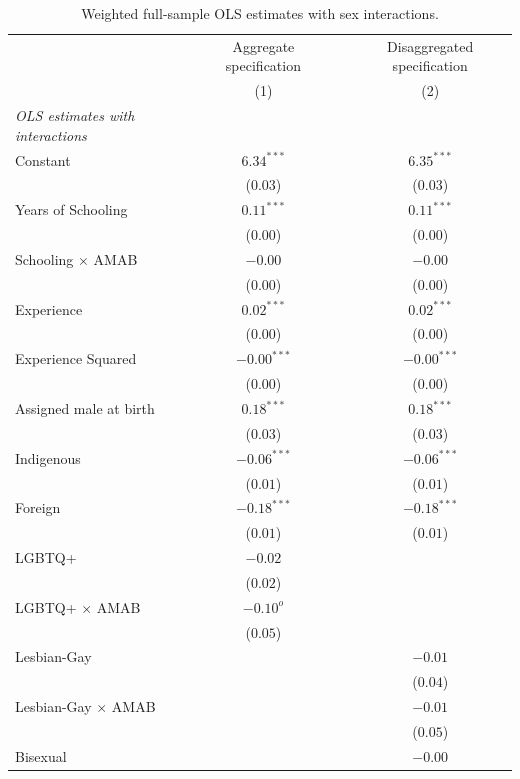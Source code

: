 \begin{table}[H]
\begin{center}
\begin{threeparttable}
\captionsetup{margin=0.5cm}
\caption{Weighted full-sample OLS estimates with sex interactions.}
\label{tab:MCO_CASEN_2cols}
\footnotesize
\centering
\begin{tabular}{lccc}
\toprule
 & \multicolumn{1}{c}{Aggregate specification} & & \multicolumn{1}{c}{Disaggregated specification} \\ 
 & (1) & & (2) \\ \midrule
\textit{OLS estimates with interactions} & &  &  \\ 
Constant & $6.34^{***}$ & & $6.35^{***}$ \\ 
 & ($0.03$) & & ($0.03$) \\ 
Years of Schooling & $0.11^{***}$ & & $0.11^{***}$ \\ 
 & ($0.00$) & & ($0.00$) \\ 
Schooling $\times$ AMAB & $-0.00$ & & $-0.00$ \\ 
 & ($0.00$) & & ($0.00$) \\ 
Experience & $0.02^{***}$ & & $0.02^{***}$ \\ 
 & ($0.00$) & & ($0.00$) \\ 
Experience Squared & $-0.00^{***}$ & & $-0.00^{***}$ \\ 
 & ($0.00$) & & ($0.00$) \\ 
Assigned male at birth & $0.18^{***}$ & & $0.18^{***}$ \\ 
 & ($0.03$) & & ($0.03$) \\ 
Indigenous & $-0.06^{***}$ & & $-0.06^{***}$ \\ 
 & ($0.01$) & & ($0.01$) \\ 
Foreign & $-0.18^{***}$ & & $-0.18^{***}$ \\ 
 & ($0.01$) & & ($0.01$) \\ 
LGBTQ+ & $-0.02$ & &  \\ 
 & ($0.02$) & &  \\ 
LGBTQ+ $\times$ AMAB & $-0.10^{o}$ & &  \\ 
 & ($0.05$) & &  \\ 
Lesbian-Gay &  & & $-0.01$ \\ 
 &  & & ($0.04$) \\ 
Lesbian-Gay $\times$ AMAB &  & & $-0.01$ \\ 
 &  & & ($0.05$) \\ 
Bisexual &  & & $-0.00$ \\ 

\end{tabular}
\end{threeparttable}
\end{center}
\end{table}
